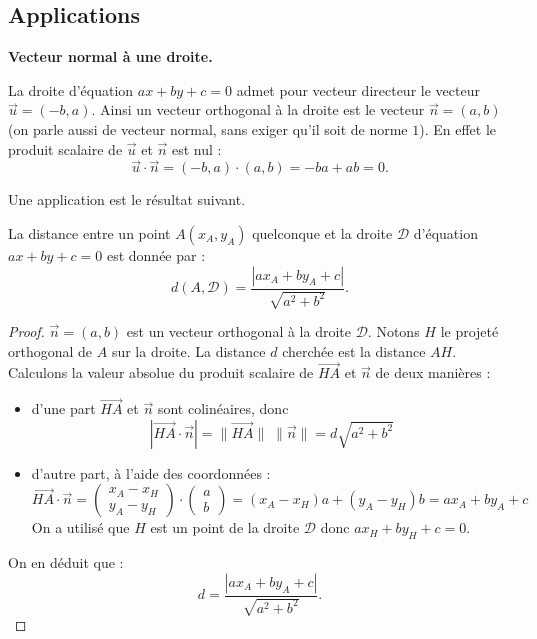 \documentclass[11pt,class=report,crop=false]{standalone}
\begin{document}
\subsection{Applications}

\textbf{Vecteur normal à une droite.}

La droite d'équation $ax+by+c=0$ admet pour vecteur directeur le vecteur $\vec u = (-b,a)$. Ainsi un vecteur orthogonal à la droite est le vecteur $\vec n = (a,b)$ (on parle aussi de \og{}vecteur normal\fg{}, sans exiger qu'il soit de norme $1$). En effet le produit scalaire de $\vec u$ et $\vec n$ est nul :
$$
    \vec u \cdot \vec n = (-b,a) \cdot (a,b) = -ba + ab = 0.
$$





Une application est le résultat suivant.
\begin{proposition}
La distance entre un point $A(x_A,y_A)$ quelconque et la droite $\mathcal{D}$ d'équation $ax+by+c=0$ est donnée par :
$$
    d(A,\mathcal{D}) = \frac{\left|ax_A + by_A + c\right|}{\sqrt{a^2 + b^2}}.
$$
\end{proposition}



\begin{proof}
$\vec n = (a,b)$ est un vecteur orthogonal à la droite $\mathcal{D}$.
Notons $H$ le projeté orthogonal de $A$ sur la droite.
La distance $d$ cherchée est la distance $AH$.     
Calculons la valeur absolue du produit scalaire de $\vec{HA}$ et $\vec n$ de deux manières :
\begin{itemize}
    \item d'une part $\vec{HA}$ et $\vec n$ sont colinéaires, donc 
    $$| \vec{HA} \cdot \vec n |    =  \| \vec{HA} \| \; \| \vec n \| = d \sqrt{a^2+b^2}$$
    \item d'autre part, à l'aide des coordonnées :
    $$\vec{HA}  \cdot  \vec n  = \begin{pmatrix}
    x_A - x_H \\
    y_A - y_H
    \end{pmatrix} \cdot \begin{pmatrix}
    a \\
    b
    \end{pmatrix} = (x_A - x_H) a + (y_A - y_H) b = ax_A + by_A + c$$
    On a utilisé que $H$ est un point de la droite $\mathcal{D}$ donc $ax_H + by_H + c = 0$.    
\end{itemize}
On en déduit que :
$$
    d = \frac{\left|ax_A + by_A + c\right|}{\sqrt{a^2 + b^2}}.
$$

\end{proof}
\end{document}
